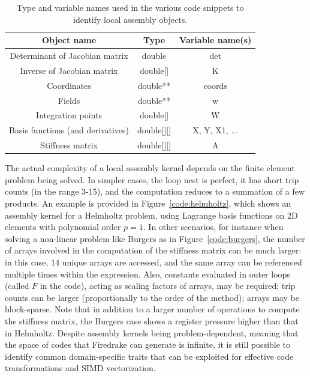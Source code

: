 \documentclass[conference]{IEEEtran}
\begin{document}
\begin{table}[h]
\begin{center}
\begin{tabulary}{1.0\columnwidth}{|C|C|C|}
\hline
Object name & Type & Variable name(s) \\\hline\hline
Determinant of Jacobian matrix & double & det  \\ \hline
Inverse of Jacobian matrix & double[] & K \\ \hline
Coordinates & double** & coords\\ \hline
Fields & double** & w \\ \hline
Integration points & double[] & W \\ \hline
Basis functions (and derivatives) & double[][] & X, Y, X1, ... \\ \hline
Stiffness matrix & double[][] & A\\ \hline
\end{tabulary}
\end{center}
\caption{Type and variable names used in the various code snippets to identify local assembly objects.}
\label{table:map-name-letters}
\end{table}

The actual complexity of a local assembly kernel depends on the finite element problem being solved. In simpler cases, the loop nest is perfect, it has short trip counts (in the range 3-15), and the computation reduces to a summation of a few products. An example is provided in Figure~\ref{code:helmholtz}, which shows an assembly kernel for a Helmholtz problem, using Lagrange basis functions on 2D elements with polynomial order $p=1$. In other scenarios, for instance when solving a non-linear problem like Burgers as in Figure~\ref{code:burgers}, the number of arrays involved in the computation of the stiffness matrix can be much larger: in this case, 14 unique arrays are accessed, and the same array can be referenced multiple times within the expression. Also, constants evaluated in outer loops (called $F$ in the code), acting as scaling factors of arrays, may be required; trip counts can be larger (proportionally to the order of the method); arrays may be block-sparse. Note that in addition to a larger number of operations to compute the stiffness matrix, the Burgers case shows a register pressure higher than that in Helmholtz. Despite assembly kernels being problem-dependent, meaning that the space of codes that Firedrake can generate is infinite, it is still possible to identify common domain-specific traits that can be exploited for effective code transformations and SIMD vectorization. 
\end{document}
